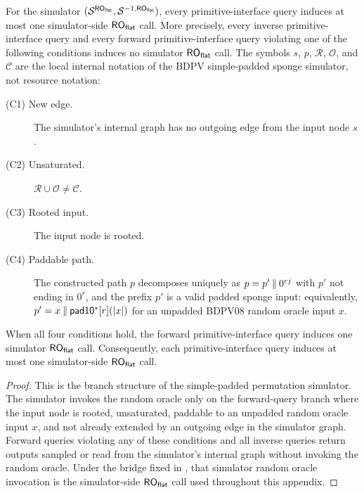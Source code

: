 \begin{lemma}
\label{lem:sim-ro-call-filter}
For the simulator $(\mathcal{S}^{\mathsf{RO}_{\mathsf{flat}}},\mathcal{S}^{-1,\mathsf{RO}_{\mathsf{flat}}})$, every
primitive-interface query induces at most one simulator-side $\mathsf{RO}_{\mathsf{flat}}$ call.
More precisely, every inverse primitive-interface query and every forward
primitive-interface query violating one of the following conditions induces no
simulator $\mathsf{RO}_{\mathsf{flat}}$ call. The symbols $s$, $p$, $\mathcal{R}$, $\mathcal{O}$,
and $\mathcal{C}$ are the local internal notation of the BDPV simple-padded
sponge simulator, not \TW{} resource notation:
\begin{description}
  \item[(C1) New edge.] The simulator's internal graph has no
    outgoing edge from the input node $s$.
  \item[(C2) Unsaturated.] $\mathcal{R} \cup \mathcal{O} \neq
    \mathcal{C}$.
  \item[(C3) Rooted input.] The input node is rooted.
  \item[(C4) Paddable path.] The constructed path $p$ decomposes
    uniquely as $p = p' \mathbin{\|} 0^{rj}$ with $p'$ not ending in
    $0^r$, and the prefix $p'$ is a valid padded sponge input:
    equivalently, $p' = x \mathbin{\|} \mathsf{pad10^*}[r](|x|)$ for an unpadded
    BDPV08 random oracle input $x$.
\end{description}
When all four conditions hold, the forward primitive-interface query
induces one simulator $\mathsf{RO}_{\mathsf{flat}}$ call. Consequently, each
primitive-interface query induces at most one simulator-side
$\mathsf{RO}_{\mathsf{flat}}$ call.
\end{lemma}

\begin{proof}
This is the branch structure of the \cite{BDPV08} simple-padded
permutation simulator. The simulator invokes the random oracle only on
the forward-query branch where the input
node is rooted, unsaturated, paddable to an unpadded random oracle
input $x$, and not already extended by an outgoing edge in the
simulator graph. Forward queries violating any
of these conditions and all inverse queries return outputs sampled or
read from the simulator's internal graph without invoking the
random oracle. Under the \cite[Theorem~3]{BDPV11} bridge fixed in
, that simulator random oracle invocation is the
simulator-side $\mathsf{RO}_{\mathsf{flat}}$ call used throughout this appendix.
\end{proof}

